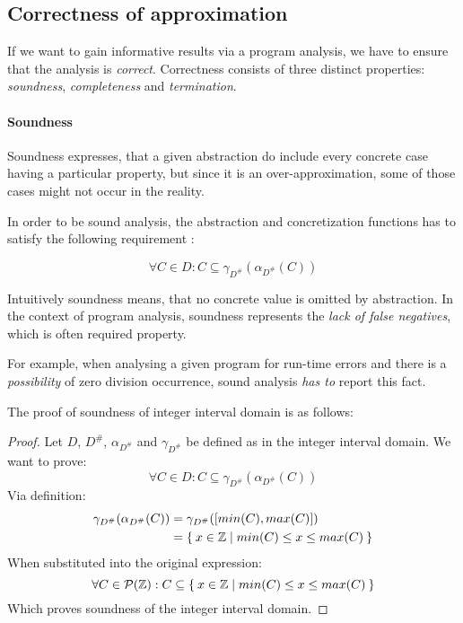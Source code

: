 \documentclass[12pt,oneside]{fithesis2}
\theoremstyle{definition}
\begin{document}
\subsection{Correctness of approximation}\label{ssec:soundness-incompleteness}

If we want to gain informative results via a program analysis, we have to ensure that the analysis is \textit{correct}. Correctness consists of three distinct properties: \textit{soundness}, \textit{completeness} and \textit{termination}.

\paragraph{Soundness}
Soundness expresses, that a given abstraction do include every concrete case having a particular property, but since it is an over-approximation, some of those cases might not occur in the reality.

In order to be sound analysis, the abstraction and concretization functions has to satisfy the following requirement \cite{mine-AIAA10}:

\[
  \forall C \in D: C \subseteq \gamma_{D^\#}(\alpha_{D^\#}(C))
\]

Intuitively soundness means, that no concrete value is omitted by abstraction. In the context of program analysis, soundness represents the \textit{lack of false negatives}, which is often required property.

For example, when analysing a given program for run-time errors and there is a \textit{possibility} of zero division occurrence, sound analysis \textit{has to} report this fact.

The proof of soundness of integer interval domain is as follows:

\begin{proof}
  Let $D$, $D^\#$, $\alpha_{D^\#}$ and $\gamma_{D^\#}$ be defined as in the integer interval domain. We want to prove:
  \[
    \forall C \in D: C \subseteq \gamma_{D^\#}(\alpha_{D^\#}(C))
  \]
  Via definition:
  \begin{align*}
    \gamma_{D^\#}(\alpha_{D^\#}(C)) &= \gamma_{D^\#}([min(C), max(C)])\\
    &= \Set{ x \in \mathbb Z | min(C) \le x \le max(C) }
  \end{align*}
  When substituted into the original expression:
  \[
    \forall C \in \mathcal P(\mathbb Z): C \subseteq \Set{ x \in \mathbb Z | min(C) \le x \le max(C) }
  \]
  Which proves soundness of the integer interval domain.
\end{proof}
\end{document}
